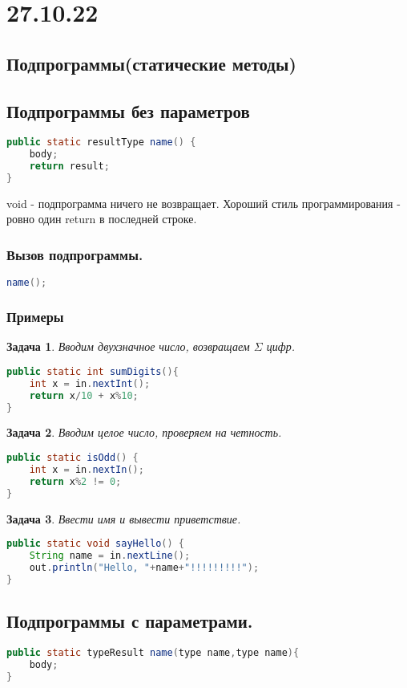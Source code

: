 \documentclass{scrartcl}
\newtheorem{task}{Задача}
\begin{document}
\section{27.10.22}
\subsection{Подпрограммы(статические методы)}
\subsection{Подпрограммы без параметров}
\begin{lstlisting}[language=Java] 
public static resultType name() {
    body;
    return result;
}
\end{lstlisting} 
void - подпрограмма ничего не возвращает. Хороший стиль программирования - ровно один return в последней строке.
\subsubsection{Вызов подпрограммы.}
\begin{lstlisting}[language=Java] 
name();
\end{lstlisting} 
\subsubsection{Примеры}
\begin{task}
    Вводим двухзначное число, возвращаем $\Sigma$ цифр.
\end{task}
\begin{lstlisting}[language=Java] 
public static int sumDigits(){
    int x = in.nextInt();
    return x/10 + x%10;
}
\end{lstlisting} 
\begin{task}
    Вводим целое число, проверяем на четность.
\end{task}
\begin{lstlisting}[language=Java] 
public static isOdd() {
    int x = in.nextIn();
    return x%2 != 0;
}
\end{lstlisting} 
\begin{task}
    Ввести имя и вывести приветствие.
\end{task}
\begin{lstlisting}[language=Java] 
public static void sayHello() {
    String name = in.nextLine();
    out.println("Hello, "+name+"!!!!!!!!!");
}
\end{lstlisting} 
\subsection{Подпрограммы с параметрами.}
\begin{lstlisting}[language=Java] 
public static typeResult name(type name,type name){
    body;
} 
\end{lstlisting} 
\end{document}
